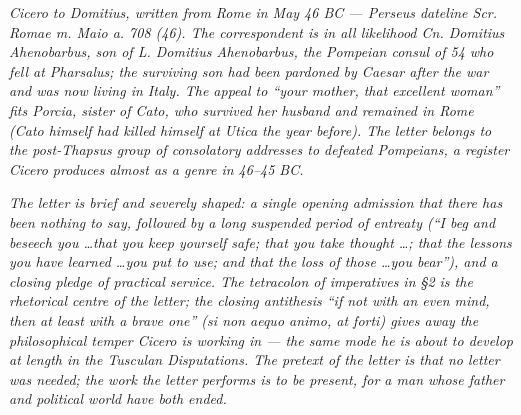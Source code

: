 
\textit{Cicero to Domitius, written from Rome in May 46 BC ---
Perseus dateline \textit{Scr. Romae m. Maio a. 708 (46)}. The
correspondent is in all likelihood Cn. Domitius Ahenobarbus,
son of L. Domitius Ahenobarbus, the Pompeian consul of 54 who
fell at Pharsalus; the surviving son had been pardoned by
Caesar after the war and was now living in Italy. The
appeal to ``your mother, that excellent woman'' fits
Porcia, sister of Cato, who survived her husband and
remained in Rome (Cato himself had killed himself at Utica
the year before). The letter belongs to the post-Thapsus
group of consolatory addresses to defeated Pompeians, a
register Cicero produces almost as a genre in 46--45 BC.}

\textit{The letter is brief and severely shaped: a single
opening admission that there has been nothing to say,
followed by a long suspended period of entreaty
(``I beg and beseech you \ldots that you keep yourself safe;
that you take thought \ldots; that the lessons you have
learned \ldots you put to use; and that the loss of those
\ldots you bear''), and a closing pledge of practical
service. The tetracolon of imperatives in \S 2 is the
rhetorical centre of the letter; the closing antithesis
``if not with an even mind, then at least with a brave one''
(\textit{si non aequo animo, at forti}) gives away the
philosophical temper Cicero is working in --- the same
mode he is about to develop at length in the
\textit{Tusculan Disputations}. The pretext of the letter
is that no letter was needed; the work the letter
performs is to be present, for a man whose father and
political world have both ended.}
